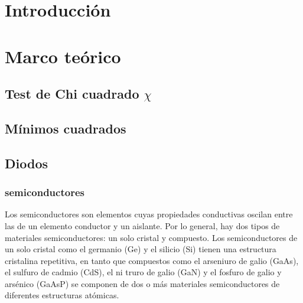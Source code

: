 \documentclass[twocolumn]{revtex4-2}
\begin{document}
\title{}
\author{Jesús Armando Cañas}
\author{Miguel Angel Perdomo}

\date{\today}


\begin{abstract}
\vspace{-0.5cm}
\end{abstract}

\maketitle

\section{Introducción}
\begingroup
\vspace{-0.3cm}


\section{Marco teórico}
\subsection{Test de Chi cuadrado $\chi$ }
\subsection{Mínimos cuadrados}
\subsection{Diodos}
\subsubsection{semiconductores}
Los semiconductores son elementos cuyas propiedades conductivas oscilan entre las de un elemento conductor y un aislante. Por lo general, hay dos tipos de materiales semiconductores: un solo cristal y compuesto. Los semiconductores de un solo
cristal como el germanio (Ge) y el silicio (Si) tienen una
estructura cristalina repetitiva, en tanto que compuestos como
el arseniuro de galio (GaAs), el sulfuro de cadmio (CdS), el ni
truro de galio (GaN) y el fosfuro de galio y arsénico (GaAsP)
se componen de dos o más materiales semiconductores de
diferentes estructuras atómicas. ~\cite{rosadio}
\end{document}

